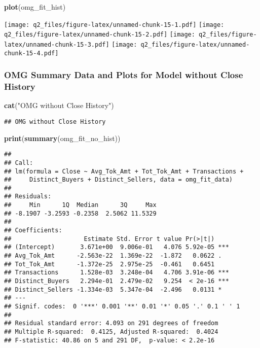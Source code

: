 \documentclass[]{article}
\newenvironment{Shaded}{\begin{snugshade}}{\end{snugshade}}
\newcommand{\KeywordTok}[1]{\textcolor[rgb]{0.13,0.29,0.53}{\textbf{#1}}}
\newcommand{\StringTok}[1]{\textcolor[rgb]{0.31,0.60,0.02}{#1}}
\newcommand{\NormalTok}[1]{#1}
\begin{document}
\begin{Shaded}
\begin{Highlighting}[]
\KeywordTok{plot}\NormalTok{(omg_fit_hist)}
\end{Highlighting}
\end{Shaded}

\texttt{[image: q2\_files/figure-latex/unnamed-chunk-15-1.pdf]}
\texttt{[image: q2\_files/figure-latex/unnamed-chunk-15-2.pdf]}
\texttt{[image: q2\_files/figure-latex/unnamed-chunk-15-3.pdf]}
\texttt{[image: q2\_files/figure-latex/unnamed-chunk-15-4.pdf]}

\subsubsection{OMG Summary Data and Plots for Model without Close
History}\label{omg-summary-data-and-plots-for-model-without-close-history}

\begin{Shaded}
\begin{Highlighting}[]
\KeywordTok{cat}\NormalTok{(}\StringTok{"OMG without Close History"}\NormalTok{)}
\end{Highlighting}
\end{Shaded}

\begin{verbatim}
## OMG without Close History
\end{verbatim}

\begin{Shaded}
\begin{Highlighting}[]
\KeywordTok{print}\NormalTok{(}\KeywordTok{summary}\NormalTok{(omg_fit_no_hist))}
\end{Highlighting}
\end{Shaded}

\begin{verbatim}
## 
## Call:
## lm(formula = Close ~ Avg_Tok_Amt + Tot_Tok_Amt + Transactions + 
##     Distinct_Buyers + Distinct_Sellers, data = omg_fit_data)
## 
## Residuals:
##     Min      1Q  Median      3Q     Max 
## -8.1907 -3.2593 -0.2358  2.5062 11.5329 
## 
## Coefficients:
##                    Estimate Std. Error t value Pr(>|t|)    
## (Intercept)       3.671e+00  9.006e-01   4.076 5.92e-05 ***
## Avg_Tok_Amt      -2.563e-22  1.369e-22  -1.872   0.0622 .  
## Tot_Tok_Amt      -1.372e-25  2.975e-25  -0.461   0.6451    
## Transactions      1.528e-03  3.248e-04   4.706 3.91e-06 ***
## Distinct_Buyers   2.294e-01  2.479e-02   9.254  < 2e-16 ***
## Distinct_Sellers -1.334e-03  5.347e-04  -2.496   0.0131 *  
## ---
## Signif. codes:  0 '***' 0.001 '**' 0.01 '*' 0.05 '.' 0.1 ' ' 1
## 
## Residual standard error: 4.093 on 291 degrees of freedom
## Multiple R-squared:  0.4125, Adjusted R-squared:  0.4024 
## F-statistic: 40.86 on 5 and 291 DF,  p-value: < 2.2e-16
\end{verbatim}
\end{document}
